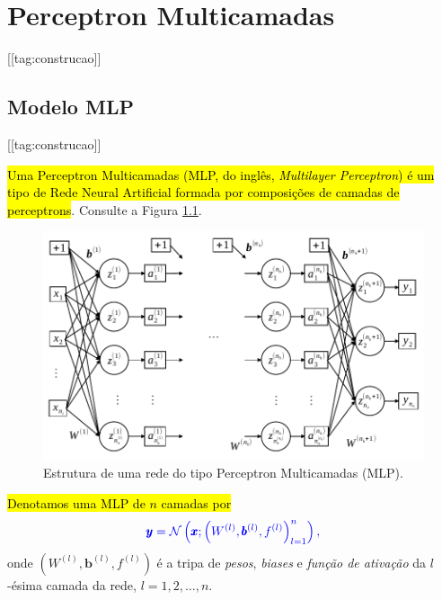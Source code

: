 
\chapter{Perceptron Multicamadas}\label{cap_mlp}
\thispagestyle{fancy}
[[tag:construcao]]

\section{Modelo MLP}\label{cap_mlp_sec_modelo}
[[tag:construcao]]

\hl{Uma Perceptron Multicamadas (MLP, do inglês, \textit{Multilayer Perceptron}) é um tipo de Rede Neural Artificial formada por composições de camadas de perceptrons}. Consulte a Figura \ref{cap_mlp_sec_modelo}.

\begin{figure}[H]
  \centering
  \includegraphics[width=\textwidth]{./cap_mlp/dados/fig_mlp/fig}
  \caption{Estrutura de uma rede do tipo Perceptron Multicamadas (MLP).}
  \label{fig:cap_mlp_sec_modelo:fig:mlp}
\end{figure}

\hl{Denotamos uma MLP de $n$ camadas por}
\begin{equation}\color{blue}\pmb{y} = \mathcal{N}\left(\pmb{x}; \left(W^{(l)}, \pmb{b}^{(l)}, f^{(l)}\right)_{l=1}^{n}\right),
\end{equation}
onde $\left(W^{(l)}, \pmb{b}^{(l)}, f^{(l)}\right)$ é a tripa de \emph{pesos}, \emph{\textit{biases}} e \emph{função de ativação} da $l$-ésima camada da rede, $l=1, 2, \dotsc, n$.

